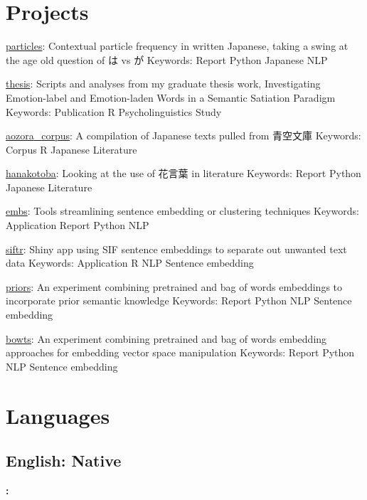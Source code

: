 \documentclass[letterpaper]{deedy-resume_sm}
\begin{document}
\section{Projects}
\href{https://github.com/ryancahildebrandt/particles}{particles}: Contextual particle frequency in written Japanese, taking a swing at the age old question of は vs が
Keywords: Report \textbullet{} Python \textbullet{} Japanese \textbullet{} NLP

\href{https://github.com/ryancahildebrandt/thesis}{thesis}: Scripts and analyses from my graduate thesis work, Investigating Emotion-label and Emotion-laden Words in a Semantic Satiation Paradigm
Keywords: Publication \textbullet{} R \textbullet{} Psycholinguistics \textbullet{} Study

\href{https://github.com/ryancahildebrandt/aozora_corpus}{aozora{\_}corpus}: A compilation of Japanese texts pulled from 青空文庫
Keywords: Corpus \textbullet{} R \textbullet{} Japanese \textbullet{} Literature

\href{https://github.com/ryancahildebrandt/hanakotoba}{hanakotoba}: Looking at the use of 花言葉 in literature 
Keywords: Report \textbullet{} Python \textbullet{} Japanese \textbullet{} Literature

\href{https://github.com/ryancahildebrandt/embs}{embs}: Tools streamlining sentence embedding or clustering techniques
Keywords: Application \textbullet{} Report \textbullet{} Python \textbullet{} NLP

\href{https://github.com/ryancahildebrandt/siftr}{siftr}: Shiny app using SIF sentence embeddings to separate out unwanted text data
Keywords: Application \textbullet{} R \textbullet{} NLP \textbullet{} Sentence embedding

\href{https://github.com/ryancahildebrandt/priors}{priors}: An experiment combining pretrained and bag of words embeddings to incorporate prior semantic knowledge
Keywords: Report \textbullet{} Python \textbullet{} NLP \textbullet{} Sentence embedding

\href{https://github.com/ryancahildebrandt/bowts}{bowts}: An experiment combining pretrained and bag of words embedding approaches for embedding vector space manipulation
Keywords: Report \textbullet{} Python \textbullet{} NLP \textbullet{} Sentence embedding

\section{Languages}
\subsection{English: Native}
\textbf{: }
\end{document}
